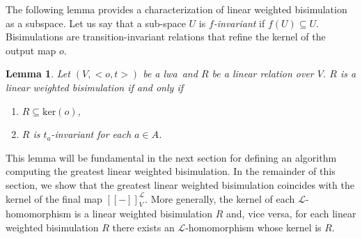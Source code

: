 \documentclass[3p]{elsarticle}
\newcommand{\fL}{\mathcal{L}}    %
\newcommand{\beh}[3]{\left[\!\left[ #1 \right]\!\right]^{#2}_{#3}} %
\newcommand{\kernel}{\mathrm{ker}} %
\newcommand{\lwa}{{\sc lwa}}           %
\newcommand{\R}{R}%
\newtheorem{lemma}{Lemma}
\begin{document}
The following lemma provides a characterization of linear weighted
bisimulation as a subspace. %
Let us say that a sub-space $U$ is \emph{$f$-invariant} if
$f(U)\subseteq U$. Bisimulations are transition-invariant relations
that refine the kernel of the output map $o$.

\begin{lemma}\label{lemma:BisAlt}
Let $(V, <o,t>)$ be a \lwa\ and $\R$ be a linear relation over $V$.
$\R$ is a linear weighted bisimulation if and only if
\begin{enumerate}
\item[(1)] $\R \subseteq \kernel(o) $,
\item[(2)] $R$ is $t_a$-invariant for each $a\in A$.
\end{enumerate}
\end{lemma}

This lemma will be fundamental in the next section for defining an
algorithm computing the greatest linear weighted bisimulation. In
the remainder of this section, we show that the greatest linear
weighted bisimulation coincides with the kernel of the final map
$\beh{-}{\fL}{V}$. More generally, the kernel of each
$\fL$-homomorphism is a linear weighted bisimulation $R$ and,
vice versa, for each linear weighted bisimulation $R$ there exists an
$\fL$-homomorphism whose kernel is $R$.
\end{document}
